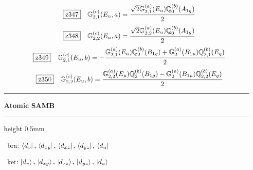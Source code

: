 \documentclass[fleqn,10pt,landscape]{jsarticle}
\begin{document}
\begin{dmath*}
\hspace*{3mm}\fbox{z347}\quad \mathbb{G}_{2,1}^{(c)}(E_{u},a)=\frac{\sqrt{2} \mathbb{G}_{2,1}^{(a)}(E_{u}) \mathbb{Q}_{0}^{(b)}(A_{1g})}{2}
\end{dmath*}
\begin{dmath*}
\hspace*{3mm}\fbox{z348}\quad \mathbb{G}_{2,2}^{(c)}(E_{u},a)=\frac{\sqrt{2} \mathbb{G}_{2,2}^{(a)}(E_{u}) \mathbb{Q}_{0}^{(b)}(A_{1g})}{2}
\end{dmath*}
\begin{dmath*}
\hspace*{3mm}\fbox{z349}\quad \mathbb{G}_{2,1}^{(c)}(E_{u},b)=- \frac{\mathbb{G}_{2,1}^{(a)}(E_{u}) \mathbb{Q}_{2}^{(b)}(B_{1g}) + \mathbb{G}_{2}^{(a)}(B_{1u}) \mathbb{Q}_{2,1}^{(b)}(E_{g})}{2}
\end{dmath*}
\begin{dmath*}
\hspace*{3mm}\fbox{z350}\quad \mathbb{G}_{2,2}^{(c)}(E_{u},b)=\frac{\mathbb{G}_{2,2}^{(a)}(E_{u}) \mathbb{Q}_{2}^{(b)}(B_{1g}) - \mathbb{G}_{2}^{(a)}(B_{1u}) \mathbb{Q}_{2,2}^{(b)}(E_{g})}{2}
\end{dmath*}
\vspace{5mm}

\vspace{5mm}
\noindent \rule[0.5mm]{5mm}{0.5mm}\hspace{3mm}\textbf{Atomic SAMB}\hspace{3mm}\leaders\hrule height 0.5mm\hfill\kern0pt
\vspace{3mm}

\vspace{5mm}

\noindent\textbullet\, bra: $\bra{d_{v}},\, \bra{d_{xy}},\, \bra{d_{xz}},\, \bra{d_{yz}},\, \bra{d_{u}}$

\noindent\textbullet\, ket: $\ket{d_{v}},\, \ket{d_{xy}},\, \ket{d_{xz}},\, \ket{d_{yz}},\, \ket{d_{u}}$
\end{document}
